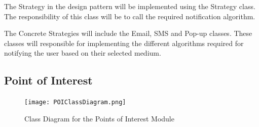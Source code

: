 \documentclass[runningheads,a4paper]{article}
\begin{document}
The Strategy in the design pattern will be implemented using the Strategy class. The responsibility of this class will be to call the required notification algorithm.

The Concrete Strategies will include the Email, SMS and Pop-up classes. These classes will responsible for implementing the different algorithms required for notifying the user based on their selected medium.


\subsection {Point of Interest}
\begin{figure}[H]
   	\centering
   	\texttt{[image: POIClassDiagram.png]}
   	\caption{Class Diagram for the Points of Interest Module}
\end{figure}
\end{document}
